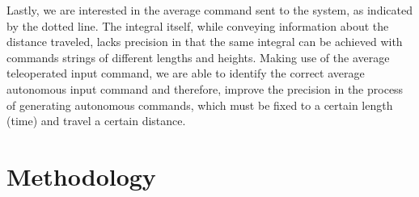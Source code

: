 \documentclass[letterpaper, 10 pt, conference]{ieeeconf}  %
\newcommand\NB[1]{$\spadesuit$\footnote{NB: #1}}
\begin{document}
Lastly, we are interested in the average command sent to the system, as indicated by the dotted line. The integral itself, while conveying information about the distance traveled, lacks precision in that the same integral can be achieved with commands strings of different lengths and heights. Making use of the average teleoperated input command, we are able to identify the correct average autonomous input command and therefore, improve the precision in the process of generating autonomous commands, which must be fixed to a certain length (time) and travel a certain distance. 


\section{Methodology} \label{sec:approach}
\end{document}

